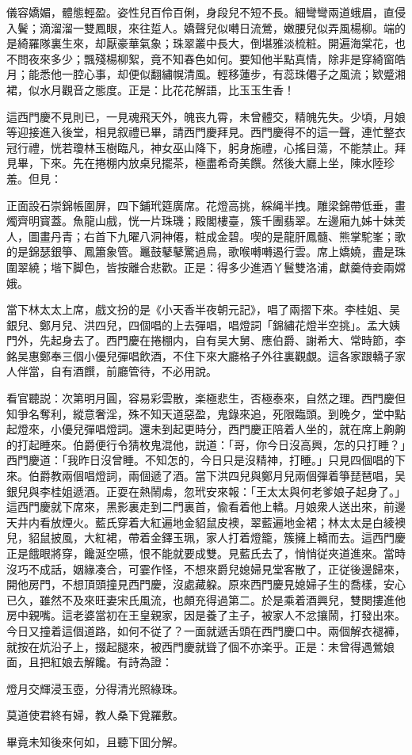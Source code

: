 \begin{myquote}
儀容嬌媚，體態輕盈。姿性兒百伶百俐，身段兒不短不長。細彎彎兩道蛾眉，直侵入鬢；滴溜溜一雙鳳眼，來往踅人。嬌聲兒似囀日流鶯，嫩腰兒似弄風楊柳。端的是綺羅隊裏生來，却厭豪華氣象；珠翠叢中長大，倒堪雅淡梳粧。開遍海棠花，也不問夜來多少；飄殘楊柳絮，竟不知春色如何。要知他半點真情，除非是穿綺窗皓月；能悉他一腔心事，却便似翻繡幌清風。輕移蓮步，有蕊珠僊子之風流；欵蹙湘裙，似水月觀音之態度。正是：比花花解語，比玉玉生香！
\end{myquote}

這西門慶不見則已，一見魂飛天外，魄丧九霄，未曾體交，精魄先失。少頃，月娘等迎接進入後堂，相見叙禮已畢，請西門慶拜見。西門慶得不的這一聲，連忙整衣冠行禮，恍若瓊林玉樹臨凡，神女巫山降下，躬身施禮，心搖目蕩，不能禁止。拜見畢，下來。先在捲棚内放桌兒擺茶，極盡希奇美饌。然後大廳上坐，陳水陸珍羞。但見：

\begin{myquote}
正面設石崇錦帳圍屏，四下鋪玳筵廣席。花燈高挑，綵䋲半拽。雕梁錦帶低垂，畫燭齊明寳蓋。魚龍山戲，恍一片珠璣；殿閣樓臺，簇千團翡翠。左邊廂九姊十妹羙人，圖畫丹青；右首下九曜八洞神僊，粧成金碧。喫的是龍肝鳳髓、熊掌駝峯；歌的是錦瑟銀箏、鳳簫象管。鼉鼓鼕鼕驚過鳥，歌喉囀囀遏行雲。席上嬌嬈，盡是珠圍翠繞；堦下脚色，皆按離合悲歡。正是：得多少進酒丫鬟雙洛浦，獻羹侍妾兩嫦娥。
\end{myquote}

當下林太太上席，戲文扮的是《小天香半夜朝元記》，唱了兩摺下來。李桂姐、吴銀兒、鄭月兒、洪四兒，四個唱的上去彈唱，唱燈詞「錦繡花燈半空挑」。孟大姨門外，先起身去了。西門慶在捲棚内，自有吴大舅、應伯爵、謝希大、常時節，李銘吴惠鄭奉三個小優兒彈唱飲酒，不住下來大廳格子外往裏觀覷。這各家跟轎子家人伴當，自有酒饌，前廳管待，不必用說。

看官聽説：次第明月圓，容易彩雲散，楽極悲生，否極泰來，自然之理。西門慶但知爭名奪利，縱意奢淫，殊不知天道惡盈，鬼錄來追，死限臨頭。到晚夕，堂中點起燈來，小優兒彈唱燈詞。還未到起更時分，西門慶正陪着人坐的，就在席上齁齁的打起睡來。伯爵便行令猜枚鬼混他，説道：「哥，你今日沒高興，怎的只打睡？」西門慶道：「我昨日沒曾睡。不知怎的，今日只是沒精神，打睡。」只見四個唱的下來。伯爵教兩個唱燈詞，兩個遞了酒。當下洪四兒與鄭月兒兩個彈着箏琵琶唱，吴銀兒與李桂姐遞酒。正耍在熱鬧䖏，忽玳安來報：「王太太與何老爹娘子起身了。」這西門慶就下席來，黑影裏走到二門裏首，偸看着他上轎。月娘衆人送出來，前邊天井内看放煙火。藍氏穿着大紅遍地金貂鼠皮襖，翠藍遍地金裙；林太太是白綾襖兒，貂鼠披風，大紅裙，帶着金鐸玉珮，家人打着燈籠，簇擁上轎而去。這西門慶正是餓眼將穿，饞涎空嚥，恨不能就要成雙。見藍氏去了，悄悄従夾道進來。當時沒巧不成話，姻緣凑合，可霎作怪，不想來爵兒媳婦見堂客散了，正従後邊歸來，開他房門，不想頂頭撞見西門慶，沒處藏躱。原來西門慶見媳婦子生的喬樣，安心已久，雖然不及來旺妻宋氏風流，也頗充得過第二。於是乘着酒興兒，雙関摟進他房中親嘴。這老婆當初在王皇親家，因是養了主子，被家人不忿攘鬧，打發出來。今日又撞着這個道路，如何不従了？一面就遞舌頭在西門慶口中。兩個解衣褪褲，就按在炕沿子上，掇起腿來，被西門慶就聳了個不亦楽乎。正是：未曾得遇鶯娘面，且把紅娘去解饞。有詩為證：

\begin{myquote}
燈月交輝浸玉壺，分得清光照綠珠。

莫道使君終有婦，教人桑下覓羅敷。
\end{myquote}

畢竟未知後來何如，且聽下囬分解。

